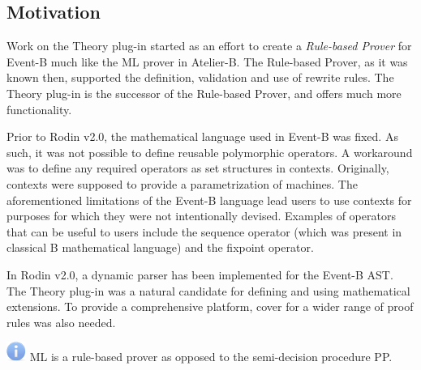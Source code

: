 \documentclass{article}      %
\begin{document}
\subsection{Motivation}
Work on the Theory plug-in started as an effort to create a \textit{Rule-based Prover} for Event-B much like the ML prover in Atelier-B. The Rule-based Prover, as it was known then, supported the definition, validation and use of rewrite rules. The Theory plug-in is the successor of the Rule-based Prover, and offers much more functionality.
\par 
Prior to Rodin v2.0, the mathematical language used in Event-B was fixed. As such, it was not possible to define reusable polymorphic operators. A workaround was to define any required operators as set structures in contexts. Originally, contexts were supposed to provide a parametrization of machines. The aforementioned limitations of the Event-B language lead users to use contexts for purposes for which they were not intentionally devised. Examples of operators that can be useful to users include the sequence operator (which was present in classical B mathematical language) and the fixpoint operator.
\par
In Rodin v2.0, a dynamic parser has been implemented for the Event-B AST. The Theory plug-in was a natural candidate for defining and using mathematical extensions. To provide a comprehensive platform, cover for a wider range of proof rules was also needed.

\includegraphics{images/info.png} ML is a rule-based prover as opposed to the semi-decision procedure PP.
\end{document}
